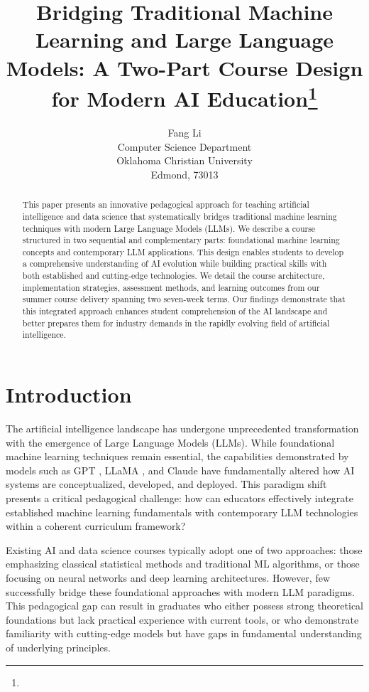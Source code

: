 \documentclass{article}
\title{Bridging Traditional Machine Learning and Large Language Models:
  A Two-Part Course Design for Modern AI
  Education\footnote{\protect}
}
\author{
  Fang Li\\
  Computer Science Department\\
  Oklahoma Christian University\\
  Edmond, 73013\\
  \email{fang.li@oc.edu}
}
\begin{document}
\maketitle

\begin{abstract}
  This paper presents an innovative pedagogical approach for teaching
  artificial intelligence and data science that systematically bridges
  traditional machine learning techniques with modern Large Language
  Models (LLMs). We describe a course structured in two sequential and
  complementary parts: foundational machine learning concepts and
  contemporary LLM applications. This design enables students to develop
  a comprehensive understanding of AI evolution while building practical
  skills with both established and cutting-edge technologies. We detail
  the course architecture, implementation strategies, assessment
  methods, and learning outcomes from our summer course delivery
  spanning two seven-week terms. Our findings demonstrate that this
  integrated approach enhances student comprehension of the AI landscape
  and better prepares them for industry demands in the rapidly evolving
  field of artificial intelligence.
\end{abstract}

\section{Introduction}

The artificial intelligence landscape has undergone unprecedented
transformation with the emergence of Large Language Models (LLMs). While
foundational machine learning techniques remain essential, the
capabilities demonstrated by models such as GPT
\cite{brown2020language}, LLaMA \cite{touvron2023llama}, and Claude
\cite{anthropic2023claude} have fundamentally altered how AI systems are
conceptualized, developed, and deployed. This paradigm shift presents a
critical pedagogical challenge: how can educators effectively integrate
established machine learning fundamentals with contemporary LLM
technologies within a coherent curriculum framework?

Existing AI and data science courses typically adopt one of two
approaches: those emphasizing classical statistical methods and
traditional ML algorithms, or those focusing on neural networks and deep
learning architectures. However, few successfully bridge these
foundational approaches with modern LLM paradigms. This pedagogical gap
can result in graduates who either possess strong theoretical
foundations but lack practical experience with current tools, or who
demonstrate familiarity with cutting-edge models but have gaps in
fundamental understanding of underlying principles.
\end{document}
